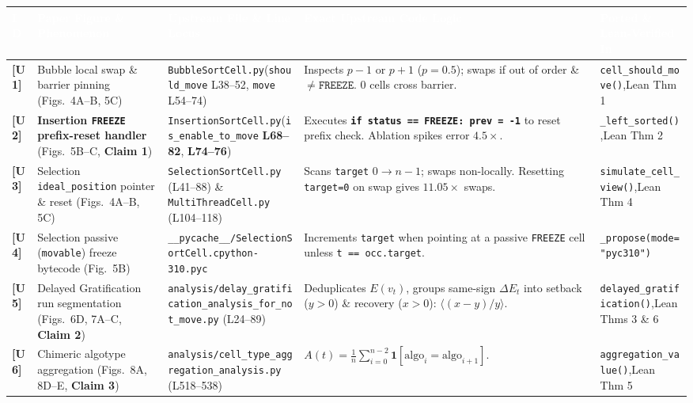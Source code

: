 \documentclass[10pt,a4paper]{article}
\begin{document}
\begin{table}[h!]
\centering
\renewcommand{\arraystretch}{1.08}
\scriptsize
\begin{tabular}{@{}p{}p{}p{}p{}p{}@{}}
\toprule
\rowcolor{navybg}
\textcolor{white}{\textbf{ID}} & \textcolor{white}{\textbf{Paper Figure \& Phenomenon}} & \textcolor{white}{\textbf{Upstream File \& Line Locus}} & \textcolor{white}{\textbf{Exact Upstream Code Logic}} & \textcolor{white}{\textbf{Ported \& Lean-Verified In}} \\
\midrule
\rowcolor{softgray}
\textbf{[U1]} & Bubble local swap \& barrier pinning (Figs.\ 4A--B, 5C) & \texttt{BubbleSortCell.py}\newline (\texttt{should\_move} L38--52, \texttt{move} L54--74) & Inspects $p-1$ or $p+1$ ($p=0.5$); swaps if out of order \& $\ne \mathtt{FREEZE}$. $0$ cells cross barrier. & \texttt{cell\_should\_move()},\newline Lean Thm 1 \\
\textbf{[U2]} & \textbf{Insertion \texttt{FREEZE} prefix-reset handler} (Figs.\ 5B--C, \textbf{Claim 1}) & \texttt{InsertionSortCell.py}\newline (\texttt{is\_enable\_to\_move} \textbf{L68--82}, \textbf{L74--76}) & Executes \textbf{\texttt{if status == FREEZE: prev = -1}} to reset prefix check. Ablation spikes error $4.5\times$. & \texttt{\_left\_sorted()},\newline Lean Thm 2 \\
\rowcolor{softgray}
\textbf{[U3]} & Selection \texttt{ideal\_position} pointer \& reset (Figs.\ 4A--B, 5C) & \texttt{SelectionSortCell.py} (L41--88) \& \texttt{MultiThreadCell.py} (L104--118) & Scans \texttt{target} $0 \to n-1$; swaps non-locally. Resetting \texttt{target=0} on swap gives $11.05\times$ swaps. & \texttt{simulate\_cell\_view()},\newline Lean Thm 4 \\
\textbf{[U4]} & Selection passive (\texttt{movable}) freeze bytecode (Fig.\ 5B) & \texttt{\_\_pycache\_\_/SelectionSortCell.\allowbreak cpython-310.pyc} & Increments \texttt{target} when pointing at a passive \texttt{FREEZE} cell unless \texttt{t == occ.target}. & \texttt{\_propose(mode=\allowbreak "pyc310")} \\
\rowcolor{softgray}
\textbf{[U5]} & Delayed Gratification run segmentation (Figs.\ 6D, 7A--C, \textbf{Claim 2}) & \texttt{analysis/delay\_gratification\_\allowbreak analysis\_for\_not\_move.py} (L24--89) & Deduplicates $E(v_t)$, groups same-sign $\Delta E_t$ into setback ($y>0$) \& recovery ($x>0$): $\langle(x-y)/y\rangle$. & \texttt{delayed\_gratification()},\newline Lean Thms 3 \& 6 \\
\textbf{[U6]} & Chimeric algotype aggregation (Figs.\ 8A, 8D--E, \textbf{Claim 3}) & \texttt{analysis/cell\_type\_\allowbreak aggregation\_analysis.py} (L518--538) & $A(t) = \frac{1}{n}\sum_{i=0}^{n-2}\mathbf{1}[\mathrm{algo}_i = \mathrm{algo}_{i+1}]$. & \texttt{aggregation\_value()},\newline Lean Thm 5 \\
\bottomrule
\end{tabular}
\end{table}
\end{document}
